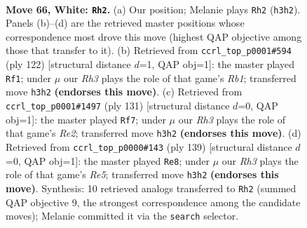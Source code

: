 \documentclass[11pt]{article}
\begin{document}
\clearpage

\begin{figure}[p]\centering
\begin{subfigure}{0.46\textwidth}\centering
\resizebox{\linewidth}{!}{%
\newchessgame
\chessboard[
  setfen={6k1/8/2r5/8/8/7R/8/5K2 w - - 12 66},
  showmover=false,
  pgfstyle=straightmove, color=movearrow, markmove={h3-h2}
]}
\caption{}
\end{subfigure}\hfill
\begin{subfigure}{0.46\textwidth}\centering
\resizebox{\linewidth}{!}{%
\newchessgame
\chessboard[
  setfen={2k5/8/4K3/r7/8/8/8/1R6 w - - 4 62},
  showmover=false,
  pgfstyle=straightmove, color=movearrow, markmove={b1-f1}
]}
\caption{}
\end{subfigure}
\\[4pt]
\begin{subfigure}{0.46\textwidth}\centering
\resizebox{\linewidth}{!}{%
\newchessgame
\chessboard[
  setfen={2R5/4r3/8/8/6k1/8/8/3K4 b - - 12 66},
  showmover=false,
  pgfstyle=straightmove, color=movearrow, markmove={e7-f7}
]}
\caption{}
\end{subfigure}\hfill
\begin{subfigure}{0.46\textwidth}\centering
\resizebox{\linewidth}{!}{%
\newchessgame
\chessboard[
  setfen={8/8/1R6/6k1/4r3/8/3K4/8 b - - 10 70},
  showmover=false,
  pgfstyle=straightmove, color=movearrow, markmove={e4-e8}
]}
\caption{}
\end{subfigure}
\caption{\textbf{Move 66, White: \texttt{Rh2}.} (a) Our position; Melanie plays \texttt{Rh2} (\texttt{h3h2}). Panels (b)--(d) are the retrieved master positions whose correspondence most drove this move (highest QAP objective among those that transfer to it). (b) Retrieved from \texttt{ccrl\_top\_p0001\#594} (ply 122) [structural distance $d$=1, QAP obj=1]: the master played \texttt{Rf1}; under $\mu$ our \emph{Rh3} plays the role of that game's \emph{Rb1}; transferred move \texttt{h3h2} \textbf{(endorses this move)}. (c) Retrieved from \texttt{ccrl\_top\_p0001\#1497} (ply 131) [structural distance $d$=0, QAP obj=1]: the master played \texttt{Rf7}; under $\mu$ our \emph{Rh3} plays the role of that game's \emph{Re2}; transferred move \texttt{h3h2} \textbf{(endorses this move)}. (d) Retrieved from \texttt{ccrl\_top\_p0000\#143} (ply 139) [structural distance $d$=0, QAP obj=1]: the master played \texttt{Re8}; under $\mu$ our \emph{Rh3} plays the role of that game's \emph{Re5}; transferred move \texttt{h3h2} \textbf{(endorses this move)}. Synthesis: 10 retrieved analogs transferred to \texttt{Rh2} (summed QAP objective 9, the strongest correspondence among the candidate moves); Melanie committed it via the \texttt{search} selector.}
\label{fig:thought-m130}
\end{figure}
\end{document}
